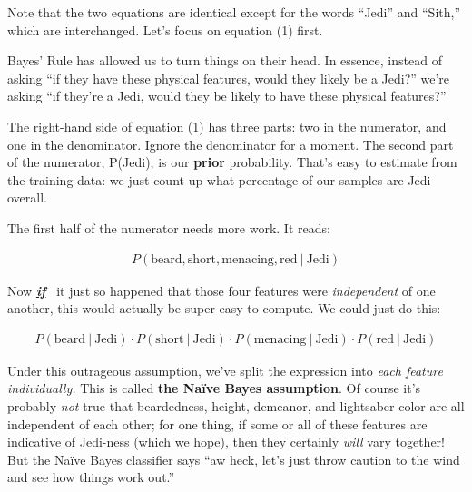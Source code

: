 Note that the two equations are identical except for the words ``Jedi'' and
``Sith,'' which are interchanged. Let's focus on equation (1) first.

Bayes' Rule has allowed us to turn things on their head. In essence, instead of
asking ``if they have these physical features, would they likely be a Jedi?''
we're asking ``if they're a Jedi, would they be likely to have these physical
features?'' 



The right-hand side of equation (1) has three parts: two in the numerator, and
one in the denominator. Ignore the denominator for a moment. The second part of
the numerator, P(Jedi), is our \textbf{prior} probability. That's easy to
estimate from the training data: we just count up what percentage of our
samples are Jedi overall.

The first half of the numerator needs more work. It reads:

\vspace{-.2in}
\begin{align*}
P(\textrm{beard},\textrm{short},\textrm{menacing},\textrm{red}\ |\ \textrm{Jedi}) 
\end{align*}


Now \textbf{\textit{\underline{if}}} \ it just so happened that those four
features were \textit{independent} of one another, this would actually be
super easy to compute. We could just do this:

\vspace{-.2in}
\begin{align*}
P(\textrm{beard} \ |\ \textrm{Jedi}) \cdot
P(\textrm{short} \ |\ \textrm{Jedi}) \cdot
P(\textrm{menacing} \ |\ \textrm{Jedi}) \cdot
P(\textrm{red} \ |\ \textrm{Jedi})
\end{align*}

Under this outrageous assumption, we've split the expression into \textit{each
feature individually.} This is called \textbf{the Na\"{i}ve Bayes assumption}.
Of course it's probably \textit{not} true that beardedness, height, demeanor,
and lightsaber color are all independent of each other; for one thing, if some
or all of these features are indicative of Jedi-ness (which we hope), then they
certainly \textit{will} vary together! But the Na\"{i}ve Bayes classifier says
``aw heck, let's just throw caution to the wind and see how things work out.''

